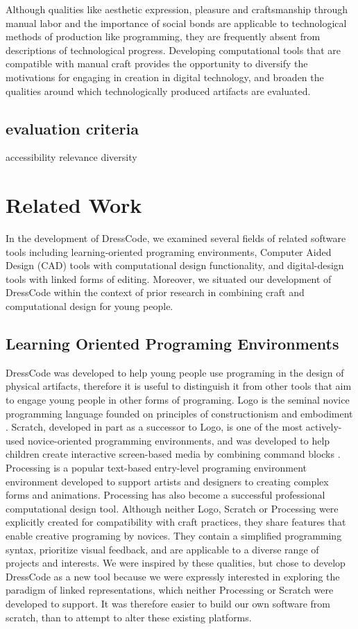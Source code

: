 \documentclass{sigchi}
\begin{document}
Although qualities like aesthetic expression, pleasure and craftsmanship through manual labor and the importance of social bonds are applicable to technological methods of production like programming, they are frequently absent from descriptions of technological progress. Developing computational tools that are compatible with manual craft provides the opportunity to diversify the motivations for engaging in creation in digital technology, and broaden the qualities around which technologically produced artifacts are evaluated.

\subsection{evaluation criteria}
 accessibility
 relevance
 diversity

\section{Related Work}
In the development of DressCode, we examined several fields of related software tools including learning-oriented programing environments, Computer Aided Design (CAD) tools with computational design functionality, and digital-design tools with linked forms of editing. Moreover, we situated our development of DressCode within the context of prior research in combining craft and computational design for young people.

\subsection{Learning Oriented Programing Environments}
 DressCode was developed to help young people use programing in the design of physical artifacts, therefore it is useful to distinguish it from other tools that aim to engage young people in other forms of programing. Logo is the seminal novice programming language founded on principles of constructionism and embodiment \cite{papert}. Scratch, developed in part as a successor to Logo, is one of the most actively-used novice-oriented programming environments, and was developed to help children create interactive screen-based media by combining command blocks \cite{resnick2}. Processing is a popular text-based entry-level programing environment environment developed to support artists and designers to creating complex forms and animations. Processing has also become a successful professional computational design tool\cite{processing}. Although neither Logo, Scratch or Processing were explicitly created for compatibility with craft practices, they share features that enable creative programing by novices. They contain a simplified programming syntax, prioritize visual feedback, and are applicable to a diverse range of projects and interests. We were inspired by these qualities, but chose to develop DressCode as a new tool because we were expressly interested in exploring the paradigm of linked representations, which neither Processing or Scratch were developed to support. It was therefore easier to build our own software from scratch, than to attempt to alter these existing platforms.
\end{document}
